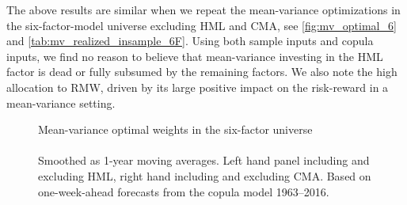 The above results are similar when we repeat the mean-variance optimizations in the six-factor-model universe excluding HML and CMA, see \autoref{fig:mv_optimal_6} and \autoref{tab:mv_realized_insample_6F}. Using both sample inputs and copula inputs, we find no reason to believe that mean-variance investing in the HML factor is dead or fully subsumed by the remaining factors. We also note the high allocation to RMW, driven by its large positive impact on the risk-reward in a mean-variance setting. 

\begin{figure}[htbp]
  \centering
  \footnotesize
  \renewcommand{\arraystretch}{1.2}
  \caption{Mean-variance optimal weights in the six-factor universe \\ \quad \\ Smoothed as 1-year moving averages. Left hand panel including and excluding HML, right hand including and excluding CMA. Based on one-week-ahead forecasts from the copula model 1963--2016.}
  \label{fig:mv_optimal_6}


\end{figure}

